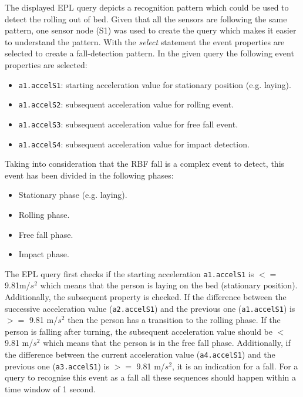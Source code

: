 \documentclass[journal]{IEEEtran}
\begin{document}
The displayed EPL query depicts a recognition pattern which could be used to detect the rolling out of bed. Given that all the sensors are following the same pattern, one sensor node (S1) was used to create the query which makes it easier to understand the pattern. With the \textit{select} statement the event properties are selected to create a fall-detection pattern. In the given query the following event properties are selected:
\begin{itemize}
  \item \texttt{\small{a1.accelS1}}: starting acceleration value for stationary position (e.g. laying).
  \item \texttt{\small{a1.accelS2}}: subsequent acceleration value for rolling event.
  \item \texttt{\small{a1.accelS3}}: subsequent acceleration value for free fall event.
  \item \texttt{\small{a1.accelS4}}: subsequent acceleration value for impact detection.
\end{itemize}

Taking into consideration that the RBF fall is a complex event to detect, this event has been divided in the following phases:

\begin{itemize}
  \item Stationary phase (e.g. laying).
  \item Rolling phase.
  \item Free fall phase.
  \item Impact phase.
\end{itemize}

The EPL query first checks if the starting acceleration \texttt{\small{a1.accelS1}} is $<=$ 9.81m/$s^2$ which means that the person is laying 
on the bed (stationary position). Additionally, the subsequent property is checked. If the difference between the successive 
acceleration value (\texttt{\small{a2.accelS1}}) and the previous one (\texttt{\small{a1.accelS1}}) is $>=$ 9.81 m/$s^2$ then the person has a transition to 
the rolling phase. If the person is falling after turning, the subsequent acceleration value should be $<$ 9.81 m/$s^2$ 
which means that the person is in the free fall phase. Additionally, if the difference between the current acceleration value 
(\texttt{\small{a4.accelS1}}) and the previous one (\texttt{\small{a3.accelS1}}) is
$>=$ 9.81 m/$s^2$, it is an indication for a fall. For a query to
recognise this event as a fall all these sequences should happen within a time window of 1 second.
\end{document}
